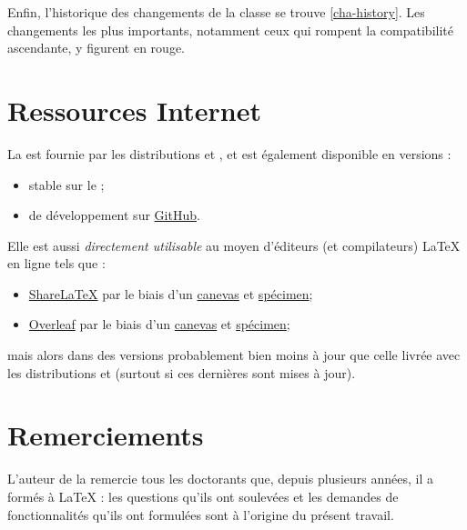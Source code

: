Enfin, l'historique des changements de la classe se trouve \vref{cha-history}.
Les changements les plus importants, notamment ceux qui rompent la compatibilité
ascendante, y figurent en rouge.

\section{Ressources Internet}
\label{sec-ressources-internet}
%

La \yatCl{} est fournie par les distributions \texlive et \miktex, et est également disponible en versions :
\begin{itemize}
\item stable sur le \href{https://ctan.org/pkg/yathesis}{} ;
\item de développement sur \href{https://github.com/dbitouze/yathesis}{GitHub}.
\end{itemize}

Elle est aussi \emph{directement utilisable} au moyen d'éditeurs (et compilateurs)
\LaTeX{} en ligne%
%
%
%
%
tels que :
\begin{itemize}
\item \href{https://fr.sharelatex.com/}{ShareLaTeX} par le biais d'un
  \href{https://frama.link/sharelatex-yathesis-template}{canevas}
  et
  \href{https://frama.link/sharelatex-yathesis-specimen}{spécimen}\detailsspecimencanevas ;
\item \href{https://www.overleaf.com/}{Overleaf} par le biais d'un
  \href{https://frama.link/overleaf-yathesis-template}{canevas}
  et
  \href{https://frama.link/overleaf-yathesis-sample}{spécimen}\detailsspecimencanevas ;
\end{itemize}
mais alors dans des versions probablement bien moins à jour que celle livrée
avec les distributions \texlive et \miktex (surtout si ces dernières sont mises
à jour).

\section{Remerciements}
\label{sec-remerciements}

L'auteur de la \yatCl{} remercie tous les doctorants que, depuis plusieurs
années, il a formés à \LaTeX{} : les questions qu'ils ont soulevées et les
demandes de fonctionnalités qu'ils ont formulées sont à l'origine du présent
travail.

